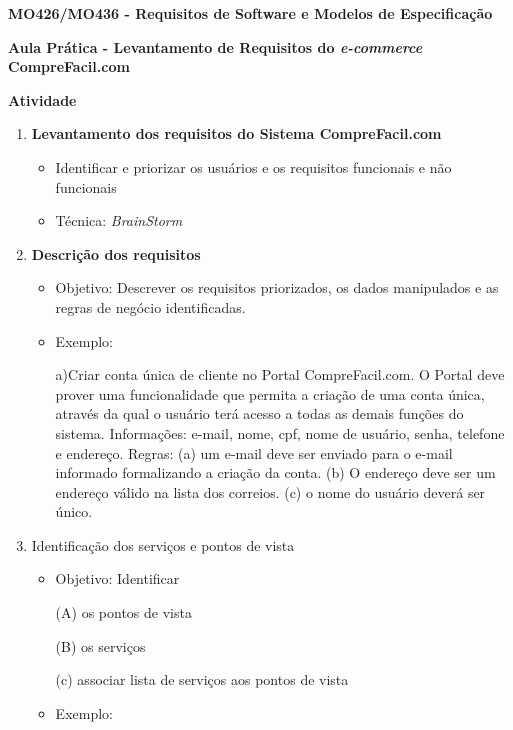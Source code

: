 \documentclass[12pt,twoside,a4paper]{article}
\begin{document}

\begin{center} 
\textbf{MO426/MO436 - Requisitos de Software e Modelos de Especificação}

\textbf{Aula Prática - Levantamento de Requisitos do \textit{e-commerce}
CompreFacil.com}

\vskip 20mm

\textbf{Atividade}

\end{center}

\begin{enumerate}
\item \textbf{Levantamento dos requisitos do Sistema CompreFacil.com}

	\begin{itemize}

		\item Identificar e priorizar os usuários e os requisitos funcionais e não funcionais
		\item Técnica: \textit{BrainStorm} 

	\end{itemize}
	
\item \textbf{Descrição dos requisitos}

	\begin{itemize}
	
	\item Objetivo: Descrever os requisitos priorizados, os dados manipulados e as regras de negócio identificadas.
	\item Exemplo: 

	a)Criar conta única de cliente no Portal CompreFacil.com. O Portal
	deve prover uma funcionalidade que permita a criação de uma conta única,
	através da qual o usuário terá acesso a todas as demais funções do sistema. Informações: e-mail, nome, cpf, nome de usuário, senha, telefone e endereço. Regras: (a) 	um e-mail deve ser enviado para o e-mail informado formalizando a criação da conta. (b) O endereço deve ser um endereço válido na lista dos correios. (c) o nome do usuário deverá ser único.
	
	\end{itemize}
	
\item Identificação dos serviços e pontos de vista

	\begin{itemize}
	
	\item Objetivo:
	Identificar
	
	(A) os pontos de vista
	
	(B) os serviços
	
	(c) associar lista de serviços aos pontos de vista 
	
	\item Exemplo:
	
	\end{itemize}

\end{enumerate}
\end{document}
